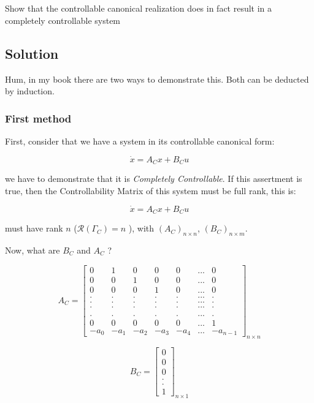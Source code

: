 \documentclass[10pt,a4paper]{article}
\begin{document}
\section{}
Show that the controllable canonical realization does in fact result in a completely controllable system
\subsection*{Solution}
Hum, in my book there are two ways to demonstrate this. Both can be deducted by induction.

\subsubsection*{First method}
First, consider that we have a system in its controllable canonical form:

\[ \dot{x} = A_{C}x + B_{C}u \]

we have to demonstrate that it is \textit{Completely Controllable}. If this assertment is true, then the Controllability Matrix of this system must be full rank, this is:

\[ \dot{x} = A_{C}x + B_{C}u \]

must have rank $n$ ($\mathcal{R}(\Gamma_{C}) = n$ ), with $(A_{C})_{n \times n}$, $(B_{C})_{n \times m}$. 

Now, what are $B_{C}$ and $A_{C}$ ?

\[
A_{C} =
\begin{bmatrix}
0 & 1 & 0 & 0 & 0 & ... & 0 \\
0 & 0 & 1 & 0 & 0 & ... & 0 \\
0 & 0 & 0 & 1 & 0 & ... & 0 \\
. & . & . & . & . & ... & . \\
. & . & . & . & . & ... & . \\
. & . & . & . & . & ... & . \\\\
. & . & . & . & . & ... & . \\
0 & 0 & 0 & 0 & 0 & ... & 1 \\
-a_{0} & -a_{1} & -a_{2} & -a_{3} & -a_{4} & ... & -a_{n-1} 
\end{bmatrix}_{n \times n}
\]

\[
B_{C} =
\begin{bmatrix}
0 \\
0 \\
0 \\
. \\
. \\
1 
\end{bmatrix}_{n \times 1}
\]
\end{document}
